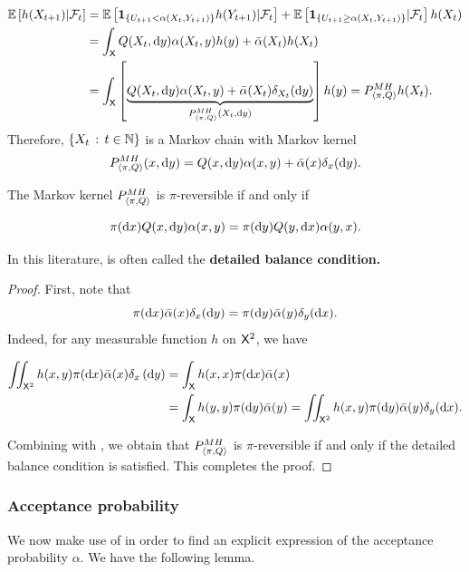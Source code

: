 \documentclass[english,graybox,envcountchap,envcountsame,sectrefs,shortlabels]{svmono}
\theoremstyle{style}
\newenvironment{svmultproof}{\small \begin{proof}}{\end{proof}}
\newcommand{\bs}{\begin{shaded}}
\newcommand{\es}{\end{shaded}}
\begin{document}
\begin{align*}
\mathbb{E}\left[h(X_{t+1})|\mathcal{F}_{t}\right] & =\mathbb{E}\left[\mathbf{1}_{\left\{ U_{t+1}<\alpha(X_{t},Y_{t+1})\right\} }h(Y_{t+1})|\mathcal{F}_{t}\right]+\mathbb{E}\left[\mathbf{1}_{\left\{ U_{t+1}\geq\alpha(X_{t},Y_{t+1})\right\} }|\mathcal{F}_{t}\right]h(X_{t})\\
 & =\int_{\mathsf{X}}Q(X_{t},\mathrm{d} y)\alpha(X_{t},y)h(y)+\bar{\alpha}(X_{t})h(X_{t})\\
 & =\int_{\mathsf{X}}\left[\underbrace{Q(X_{t},\mathrm{d} y)\alpha(X_{t},y)+\bar{\alpha}(X_{t})\delta_{X_{t}}(\mathrm{d} y)}_{P_{\langle\pi,Q\rangle}^{MH}(X_{t},\mathrm{d} y)}\right]h(y)=P_{\langle\pi,Q\rangle}^{MH}h(X_{t}).
\end{align*}
Therefore, $\left\{ X_{t}\,:\,t\in\mathbb{N}\right\}$ is a Markov chain with Markov
kernel
\begin{equation}
P_{\langle\pi,Q\rangle}^{MH}(x,\mathrm{d} y)=Q(x,\mathrm{d} y)\alpha(x,y)+\bar{\alpha}(x)\delta_{x}(\mathrm{d} y).\label{eq:def:mh}
\end{equation}
 \bs
\begin{lemma}
\label{lem:reversible} The Markov kernel $P_{\langle\pi,Q\rangle}^{MH}$ is $\pi$-reversible
if and only if

\begin{equation}
\pi(\mathrm{d} x)Q(x,\mathrm{d} y)\alpha(x,y)=\pi(\mathrm{d} y)Q(y,\mathrm{d} x)\alpha(y,x).\label{eq:balance:detaillee}
\end{equation}
\end{lemma}
\es In this literature,  is often called
the \textbf{detailed balance condition.}
\begin{svmultproof}
First, note that
\begin{equation}
\pi(\mathrm{d} x)\bar{\alpha}(x)\delta_{x}(\mathrm{d} y)=\pi(\mathrm{d} y)\bar{\alpha}(y)\delta_{y}(\mathrm{d} x).\label{eq:balance:dirac}
\end{equation}
Indeed, for any measurable function $h$ on $\mathsf{X}^{2}$, we have

\begin{align*}
\iint_{\mathsf{X}^{2}}h(x,y)\pi(\mathrm{d} x)\bar{\alpha}(x)\delta_{x}\left(\mathrm{d} y\right) & =\int_{\mathsf{X}}h(x,x)\pi(\mathrm{d} x)\bar{\alpha}(x)\\
 & =\int_{\mathsf{X}}h(y,y)\pi(\mathrm{d} y)\bar{\alpha}(y)=\iint_{\mathsf{X}^{2}}h(x,y)\pi(\mathrm{d} y)\bar{\alpha}(y)\delta_{y}(\mathrm{d} x).
\end{align*}

Combining  with , we obtain that
$P_{\langle\pi,Q\rangle}^{MH}$ is $\pi$-reversible if and only if the detailed balance
condition  is satisfied. This completes
the proof.
\end{svmultproof}


\subsubsection{Acceptance probability}
We now make use of  in order to find an explicit
expression of the acceptance probability $\alpha$. We have the following
lemma.
\end{document}
